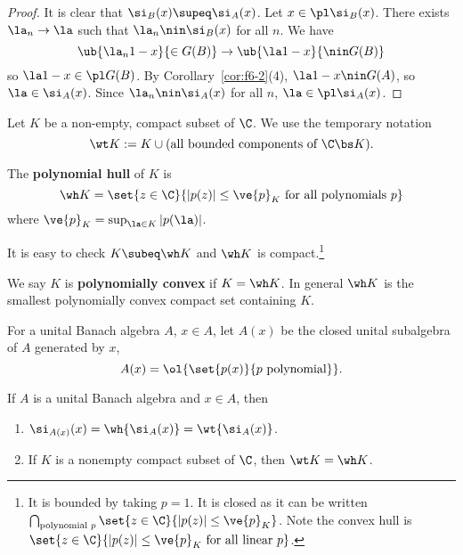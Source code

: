 \begin{proof}
It is clear that $\si_B(x)\supeq \si_A(x)$. Let $x\in \pl \si_B(x)$. There exists $\la_n\to \la$ such that $\la_n\nin \si_B(x)$ for all $n$. We have 
\[
\ub{\la_n 1-x}{\in G(B)}\to \ub{\la 1-x}{\nin G(B)}
\]
so $\la1-x\in \pl G(B)$. By Corollary~\ref{cor:f6-2}(4), $\la1-x\nin G(A)$, so $\la\in \si_A(x)$. Since $\la_n\nin \si_A(x)$ for all $n$, $\la\in \pl \si_A(x)$.
\end{proof}
Let $K$ be a non-empty, compact subset of $\C$. We use the temporary notation
\[
\wt K:=K\cup (\text{all bounded components of }\C\bs K).
\]
\begin{df}
The \textbf{polynomial hull} of $K$ is
\[
\wh K=\set{z\in \C}{|p(z)|\le\ve{p}_K\text{ for all polynomials }p}
\]
where $\ve{p}_K=\sup_{\la \in K}|p(\la)|$.
\end{df}
It is easy to check $K\subeq \wh K$ and $\wh K$ is compact.\footnote{It is bounded by taking $p=1$. %
It is closed as it can be written $\bigcap_{\text{polynomial }p}\set{z\in \C}{|p(z)|\le \ve{p}_K}$. Note the convex hull is $\set{z\in \C}{|p(z)|\le \ve{p}_K\text{ for all linear }p}$.}
\begin{df}
We say $K$ is \textbf{polynomially convex} if $K=\wh K$. In general $\wh K$ is the smallest polynomially convex compact set containing $K$. 
\end{df}
For a unital Banach algebra $A$, $x\in A$, let $A(x)$ be the closed unital subalgebra of $A$ generated by $x$, 
\[
A(x)=\ol{\set{p(x)}{p\text{ polynomial}}}.
\]
\begin{thm}
If $A$ is a unital Banach algebra and $x\in A$, then
\begin{enumerate}
\item
$\si_{A(x)}(x)=\wh{\si_A(x)}=\wt{\si_A(x)}$.
\item
If $K$ is a nonempty compact subset of $\C$, then $\wt K=\wh K$.
\end{enumerate}
\end{thm}
